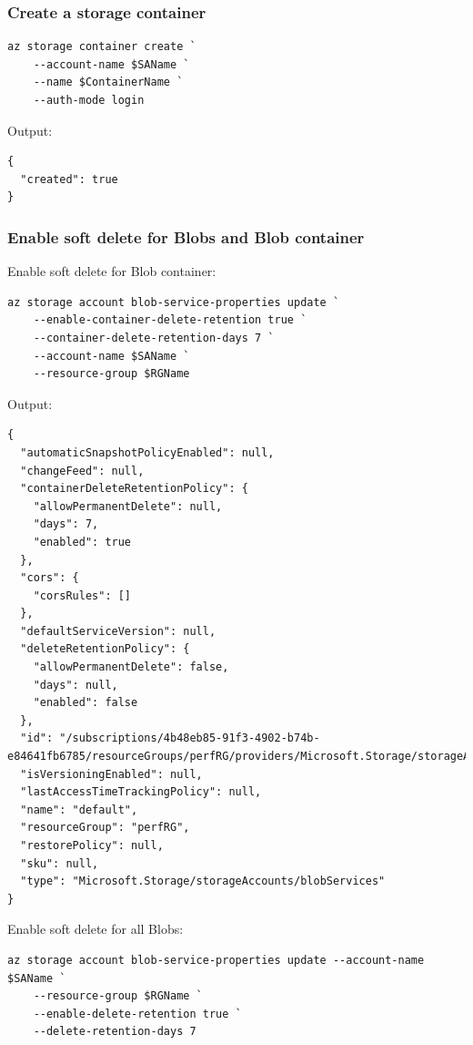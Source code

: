 \subsubsection{Create a storage container}
\label{sec:org80fd248}
\begin{verbatim}
az storage container create `
    --account-name $SAName `
    --name $ContainerName `
    --auth-mode login
\end{verbatim}

Output:
\begin{verbatim}
{
  "created": true
}
\end{verbatim}
\subsubsection{Enable soft delete for Blobs and Blob container}
\label{sec:org35b84b2}
Enable soft delete for Blob container:
\begin{verbatim}
az storage account blob-service-properties update `
    --enable-container-delete-retention true `
    --container-delete-retention-days 7 `
    --account-name $SAName `
    --resource-group $RGName
\end{verbatim}

Output:
\begin{verbatim}
{
  "automaticSnapshotPolicyEnabled": null,
  "changeFeed": null,
  "containerDeleteRetentionPolicy": {
    "allowPermanentDelete": null,
    "days": 7,
    "enabled": true
  },
  "cors": {
    "corsRules": []
  },
  "defaultServiceVersion": null,
  "deleteRetentionPolicy": {
    "allowPermanentDelete": false,
    "days": null,
    "enabled": false
  },
  "id": "/subscriptions/4b48eb85-91f3-4902-b74b-e84641fb6785/resourceGroups/perfRG/providers/Microsoft.Storage/storageAccounts/perfchbksa/blobServices/default",
  "isVersioningEnabled": null,
  "lastAccessTimeTrackingPolicy": null,
  "name": "default",
  "resourceGroup": "perfRG",
  "restorePolicy": null,
  "sku": null,
  "type": "Microsoft.Storage/storageAccounts/blobServices"
}
\end{verbatim}

Enable soft delete for all Blobs:
\begin{verbatim}
az storage account blob-service-properties update --account-name $SAName `
    --resource-group $RGName `
    --enable-delete-retention true `
    --delete-retention-days 7
\end{verbatim}

